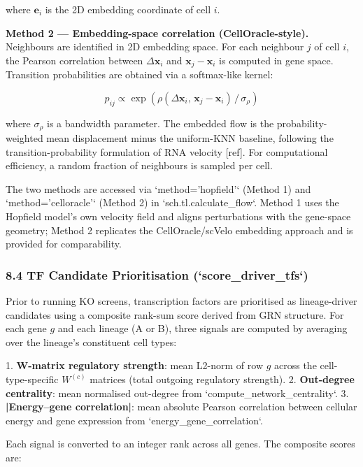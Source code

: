 \documentclass[11pt]{article}
\begin{document}
where $\mathbf{e}_i$ is the 2D embedding coordinate of cell $i$.

\textbf{Method 2 — Embedding-space correlation (CellOracle-style).} Neighbours are identified in 2D embedding space. For each neighbour $j$ of cell $i$, the Pearson correlation between $\Delta\mathbf{x}_i$ and $\mathbf{x}_j - \mathbf{x}_i$ is computed in gene space. Transition probabilities are obtained via a softmax-like kernel:

\begin{equation}
p_{ij} \propto \exp\!\left(\rho(\Delta\mathbf{x}_i,\, \mathbf{x}_j - \mathbf{x}_i) \,/\, \sigma_\rho\right)
\end{equation}

where $\sigma_\rho$ is a bandwidth parameter. The embedded flow is the probability-weighted mean displacement minus the uniform-KNN baseline, following the transition-probability formulation of RNA velocity [ref]. For computational efficiency, a random fraction of neighbours is sampled per cell.

The two methods are accessed via `method='hopfield'` (Method 1) and `method='celloracle'` (Method 2) in `sch.tl.calculate\_flow`. Method 1 uses the Hopfield model's own velocity field and aligns perturbations with the gene-space geometry; Method 2 replicates the CellOracle/scVelo embedding approach and is provided for comparability.


\subsubsection*{8.4 TF Candidate Prioritisation (`score\_driver\_tfs`)}

Prior to running KO screens, transcription factors are prioritised as lineage-driver candidates using a composite rank-sum score derived from GRN structure. For each gene $g$ and each lineage (A or B), three signals are computed by averaging over the lineage's constituent cell types:

1. \textbf{W-matrix regulatory strength}: mean L2-norm of row $g$ across the cell-type-specific $W^{(c)}$ matrices (total outgoing regulatory strength).
2. \textbf{Out-degree centrality}: mean normalised out-degree from `compute\_network\_centrality`.
3. \textbf{|Energy--gene correlation|}: mean absolute Pearson correlation between cellular energy and gene expression from `energy\_gene\_correlation`.

Each signal is converted to an integer rank across all genes. The composite scores are:
\end{document}
